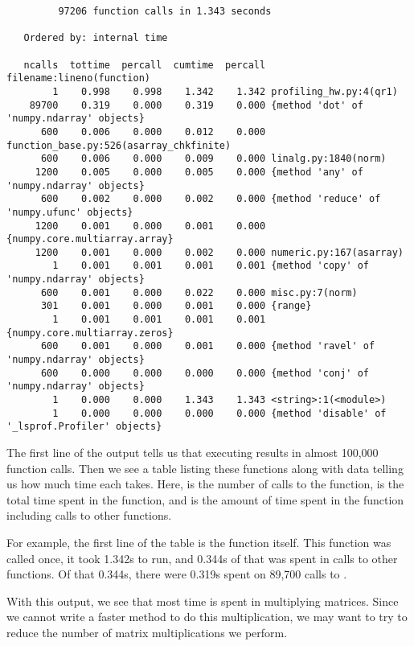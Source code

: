 {\scriptsize
\begin{verbatim}
         97206 function calls in 1.343 seconds

   Ordered by: internal time

   ncalls  tottime  percall  cumtime  percall filename:lineno(function)
        1    0.998    0.998    1.342    1.342 profiling_hw.py:4(qr1)
    89700    0.319    0.000    0.319    0.000 {method 'dot' of 'numpy.ndarray' objects}
      600    0.006    0.000    0.012    0.000 function_base.py:526(asarray_chkfinite)
      600    0.006    0.000    0.009    0.000 linalg.py:1840(norm)
     1200    0.005    0.000    0.005    0.000 {method 'any' of 'numpy.ndarray' objects}
      600    0.002    0.000    0.002    0.000 {method 'reduce' of 'numpy.ufunc' objects}
     1200    0.001    0.000    0.001    0.000 {numpy.core.multiarray.array}
     1200    0.001    0.000    0.002    0.000 numeric.py:167(asarray)
        1    0.001    0.001    0.001    0.001 {method 'copy' of 'numpy.ndarray' objects}
      600    0.001    0.000    0.022    0.000 misc.py:7(norm)
      301    0.001    0.000    0.001    0.000 {range}
        1    0.001    0.001    0.001    0.001 {numpy.core.multiarray.zeros}
      600    0.001    0.000    0.001    0.000 {method 'ravel' of 'numpy.ndarray' objects}
      600    0.000    0.000    0.000    0.000 {method 'conj' of 'numpy.ndarray' objects}
        1    0.000    0.000    1.343    1.343 <string>:1(<module>)
        1    0.000    0.000    0.000    0.000 {method 'disable' of '_lsprof.Profiler' objects}
\end{verbatim}
}


The first line of the output tells us that executing  results in
almost 100,000 function calls. Then we see a table listing these functions along
with data telling us how much time each takes. Here,  is the number
of calls to the function,  is the total time spent in the function,
and  is the amount of time spent in the function including calls
to other functions.

For example, the first line of the table is the function  itself.
This function was called once, it took 1.342s to run, and 0.344s of that was
spent in calls to other functions. Of that 0.344s, there were 0.319s spent on
89,700 calls to .

With this output, we see that most time is spent in multiplying matrices.
Since we cannot write a faster method to do this multiplication, we may want to
try to reduce the number of matrix multiplications we perform.

